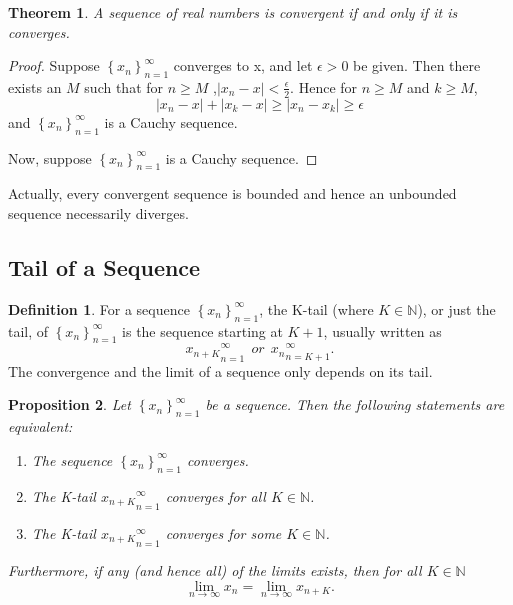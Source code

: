 \documentclass{article}
\newtheorem{theorem}{Theorem}[section]
\newtheorem{prop}[theorem]{Proposition}
\theoremstyle{definition}
\newtheorem{defi}{Definition}[section]
\begin{document}
\begin{theorem}
    A sequence of real numbers is convergent if and only if it is converges.
\end{theorem}

\begin{proof}
Suppose $\left\{x_{n}\right\}_{n=1}^{\infty}$ converges to x, and let $\epsilon>0$ be given. Then there exists 
an $M$ such that for $n\geq M$ ,$|x_{n}-x|<\frac{\epsilon}{2}.$
Hence for $n\geq M$ and $k\geq M$, 
$$|x_{n}-x|+|x_{k}-x|\geq |x_{n}-x_{k}| \geq \epsilon$$
and $\left\{x_{n}\right\}_{n=1}^{\infty}$ is a Cauchy sequence.

Now, suppose $\left\{x_{n}\right\}_{n=1}^{\infty}$ is a Cauchy sequence.
\end{proof}


Actually, every convergent sequence is bounded and hence an unbounded sequence necessarily diverges.


\subsection{Tail of a Sequence}

\begin{defi}
For a sequence $\left\{x_{n}\right\}_{n=1}^{\infty}$, the K-tail (where $K\in \mathbb{N}$), or just the tail, of $\left\{x_{n}\right\}_{n=1}^{\infty}$ is the sequence starting at $K+1$, usually written as 
$${x_{n+K}}_{n=1}^{\infty}\ \ or \ \ {x_{n}}_{n=K+1}^{\infty}.$$
The convergence and the limit of a sequence only depends on its tail.
\end{defi}

\begin{prop}
Let $\left\{x_{n}\right\}_{n=1}^{\infty}$ be a sequence. Then the following statements are equivalent:
\begin{enumerate}[label=(i)]
    \item The sequence $\left\{x_{n}\right\}_{n=1}^{\infty}$ converges.
    \item The K-tail ${x_{n+K}}_{n=1}^{\infty}$ converges for all $K\in \mathbb{N}$.
    \item The K-tail ${x_{n+K}}_{n=1}^{\infty}$ converges for some $K\in \mathbb{N}$.
\end{enumerate}

Furthermore, if any (and hence all) of the limits exists, then for all $K\in \mathbb{N}$
$$\lim_{n\to \infty}x_{n}=\lim_{n\to \infty}x_{n+K}.$$

\end{prop}
\end{document}
